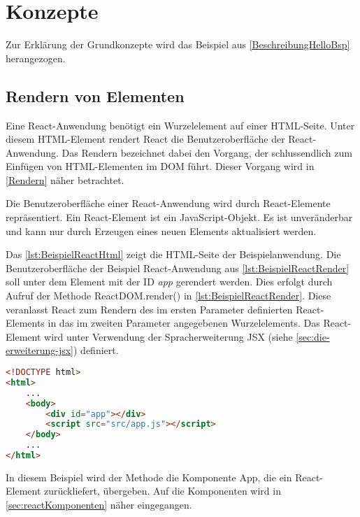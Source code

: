 \section{Konzepte}
Zur Erklärung der Grundkonzepte wird das Beispiel aus \autoref{BeschreibungHelloBsp} herangezogen.


\subsection{Rendern von Elementen}

Eine React-Anwendung benötigt ein Wurzelelement auf einer HTML-Seite. Unter diesem HTML-Element rendert React die Benutzeroberfläche der React-Anwendung. Das Rendern bezeichnet dabei den Vorgang, der schlussendlich zum Einfügen von HTML-Elementen im DOM führt. Dieser Vorgang wird in \autoref{Rendern} näher betrachtet. 

Die Benutzeroberfläche einer React-Anwendung wird durch React-Elemente repräsentiert. Ein React-Element ist ein JavaScript-Objekt. Es ist unveränderbar und kann nur durch Erzeugen eines neuen Elements aktualisiert werden.

Das \autoref{lst:BeispielReactHtml} zeigt die HTML-Seite der Beispielanwendung. Die Benutzeroberfläche der Beispiel React-Anwendung aus \autoref{lst:BeispielReactRender} soll unter dem Element mit der ID \textit{app} gerendert werden. Dies erfolgt durch Aufruf der Methode \glqq ReactDOM.render() \grqq in \autoref{lst:BeispielReactRender}. Diese veranlasst React zum Rendern des im ersten Parameter definierten React-Elements in das im zweiten Parameter angegebenen Wurzelelements. Das React-Element wird unter Verwendung der Spracherweiterung JSX (siehe \autoref{sec:die-erweiterung-jsx}) definiert.

\begin{lstlisting}[caption=Beispiel React-Anwendung: HTML-Datei , label=lst:BeispielReactHtml, language=HTML]
<!DOCTYPE html>
<html>
	...
	<body>
		<div id="app"></div>
		<script src="src/app.js"></script>
	</body>
	...
</html>
\end{lstlisting}

In diesem Beispiel wird der Methode die Komponente App, die ein React-Element zurückliefert, übergeben. Auf die Komponenten wird in \autoref{sec:reactKomponenten} näher eingegangen. \autocites[vgl.][4\psqq, 26\psqq]{Zeigermann.2016}[vgl.][]{Facebook.2018}[vgl.][]{Facebook.2018c}[vgl.][2\psqq]{Stefanov.2017}


